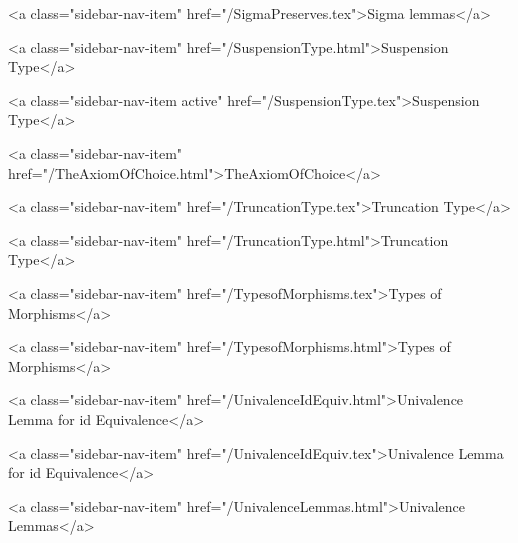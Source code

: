       
    
      
        
          <a class="sidebar-nav-item" href="/SigmaPreserves.tex">Sigma lemmas</a>
        
      
    
      
        
          <a class="sidebar-nav-item" href="/SuspensionType.html">Suspension Type</a>
        
      
    
      
        
          <a class="sidebar-nav-item active" href="/SuspensionType.tex">Suspension Type</a>
        
      
    
      
        
          <a class="sidebar-nav-item" href="/TheAxiomOfChoice.html">TheAxiomOfChoice</a>
        
      
    
      
        
          <a class="sidebar-nav-item" href="/TruncationType.tex">Truncation Type</a>
        
      
    
      
        
          <a class="sidebar-nav-item" href="/TruncationType.html">Truncation Type</a>
        
      
    
      
        
          <a class="sidebar-nav-item" href="/TypesofMorphisms.tex">Types of Morphisms</a>
        
      
    
      
        
          <a class="sidebar-nav-item" href="/TypesofMorphisms.html">Types of Morphisms</a>
        
      
    
      
        
          <a class="sidebar-nav-item" href="/UnivalenceIdEquiv.html">Univalence Lemma for id Equivalence</a>
        
      
    
      
        
          <a class="sidebar-nav-item" href="/UnivalenceIdEquiv.tex">Univalence Lemma for id Equivalence</a>
        
      
    
      
        
          <a class="sidebar-nav-item" href="/UnivalenceLemmas.html">Univalence Lemmas</a>
        
